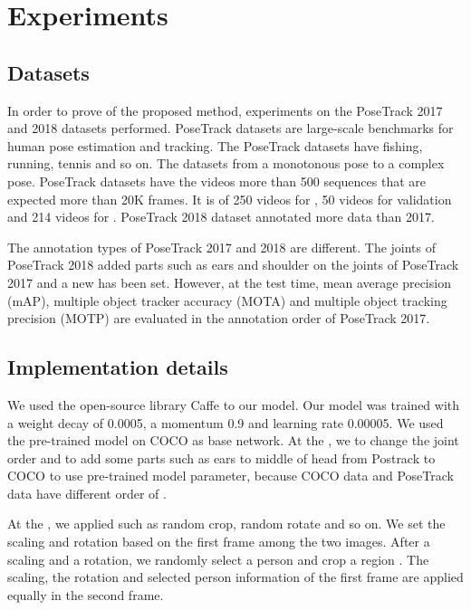 \documentclass[conference]{IEEEtran}
\begin{document}
\section{Experiments}

\subsection{Datasets}

In order to prove  of the proposed method, experiments on the PoseTrack 2017 and 2018 datasets \cite{PoseTrack}  performed. PoseTrack datasets are large-scale benchmarks for human pose estimation and tracking. The PoseTrack datasets have  fishing, running, tennis and so on. The datasets  from a monotonous pose to a complex pose.
PoseTrack datasets have the videos more than 500 sequences that are expected  more than 20K frames. It is  of 250 videos for , 50 videos for validation and 214 videos for . PoseTrack 2018 dataset annotated more data than 2017. 

The annotation types of PoseTrack 2017 and 2018 are different. The joints of PoseTrack 2018 added  parts such as ears and shoulder on  the joints of PoseTrack 2017 and a new   has been set. 
However, at the test time, mean average precision (mAP), multiple object tracker accuracy (MOTA) and multiple object tracking precision (MOTP) are evaluated in the annotation order of PoseTrack 2017. 

\subsection{Implementation details}
We used the open-source library Caffe \cite{jia2014caffe} to  our model. Our model was trained with a weight decay of 0.0005, a momentum  0.9 and  learning rate  0.00005. We used the pre-trained model  on COCO  \cite{COCO} as  base network. At the , we  to change the joint order and to add some parts such as ears to middle of head from Postrack to COCO to use  pre-trained model parameter, because COCO data and PoseTrack data have different order of . 

At the , we applied  such as random crop, random rotate and so on. 
We set the scaling and rotation  based on the first frame among the two images. After a scaling and a rotation, we randomly select a person and crop a region . The scaling, the rotation and selected person information of the first frame are applied equally in the second frame. 
\end{document}
